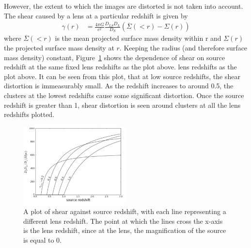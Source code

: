		However, the extent to which the images are distorted is not taken into account. The shear caused by a lens at a particular redshift is given by
		\begin{align}
			\gamma(r) &= \frac{4\pi G}{c^2}\frac{D_{LS}D_L}{D_S}\left( \overline{\Sigma}(<r)-\Sigma(r) \right)
		\end{align}
		where $\overline{\Sigma}(<r)$ is the mean projected surface mass density within r and $\Sigma(r)$ the projected surface mass density at $r$. Keeping the radius (and therefore surface mass density) constant, Figure~\ref{fig:shear_as_a_function_of_source_redshift} shows the dependence of shear on source redshift at the same fixed lens redshifts as the plot above. lens redshifts as the plot above. It can be seen from this plot, that at low source redshifts, the shear distortion is immeasurably small. As the redshift increases to around 0.5, the clusters at the lowest redshifts cause some significant distortion. Once the source redshift is greater than 1, shear distortion is seen around clusters at all the lens redshifts plotted\cite{Constraining_source_redshift_distributions}.
		\begin{figure}[!htbp]
			\centering
				\includegraphics[width=0.5\textwidth]{../Images/Shear_as_a_function_of_source_redshift.png}
			\caption[Shear as a function of source redshift]{\cite{Constraining_source_redshift_distributions}A plot of shear against source redshift, with each line representing a different lens redshift. The point at which the lines cross the x-axis is the lens redshift, since at the lens, the magnification of the source is equal to 0.\label{fig:shear_as_a_function_of_source_redshift}}
		\end{figure}

